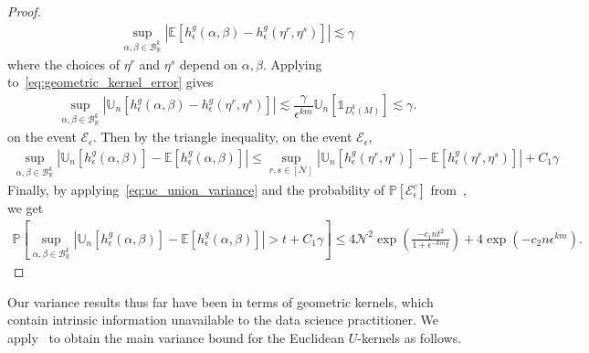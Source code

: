 \documentclass[11pt,reqno]{amsproc}
\numberwithin{equation}{section}
\newcommand{\R}{\mathbb{R}}
\newcommand{\E}{\mathbb{E}}
\newcommand{\U}{\mathbb{U}}
\newcommand{\PP}{\mathbb{P}}
\newcommand{\one}{\mathbb{1}}
\newcommand{\cN}{\mathcal{N}}
\newcommand{\cE}{\mathcal{E}}
\newcommand{\cB}{\mathcal{B}}
\newcommand{\ls}{\lesssim}
\theoremstyle{definition}
\theoremstyle{plain}
\begin{document}
\begin{proof}
        \begin{align}
            \sup_{\alpha, \beta \in \cB_\R^k} \left| \E[h^g_\epsilon(\alpha, \beta)-h^g_\epsilon(\eta^r, \eta^s)] \right| \ls \gamma
        \end{align}
        where the choices of $\eta^r$ and $\eta^s$ depend on $\alpha, \beta$. Applying~ to~\eqref{eq:geometric_kernel_error} gives
        \begin{align}
            \sup_{\alpha, \beta \in \cB_\R^k} \left| \U_n[h^g_\epsilon(\alpha, \beta)-h^g_\epsilon(\eta^r, \eta^s)] \right| \ls \dfrac{\gamma}{\epsilon^{km}} \U_n[\one_{D_\epsilon^k(M)}] \ls \gamma.
        \end{align}
        on the event $\cE_\epsilon$. Then by the triangle inequality, on the event $\cE_\epsilon$,
        \begin{align}
            \sup_{\alpha, \beta \in \cB_\R^k} \left| \U_n[h^g_\epsilon(\alpha, \beta)] - \E[h^g_\epsilon(\alpha, \beta)]\right| \leq  \sup_{r,s \in [\cN] }\left| \U_n[h^g_\epsilon(\eta^r, \eta^s)] - \E[h^g_\epsilon(\eta^r, \eta^s)]\right| + C_1 \gamma
        \end{align}
        Finally, by applying~\eqref{eq:uc_union_variance} and the probability of $\PP[\cE_\epsilon^c]$ from~, we get
        \begin{align}
            \PP \left[ \sup_{\alpha, \beta \in \cB_\R^k} \left| \U_n[h^g_\epsilon(\alpha, \beta)] - \E[h^g_\epsilon(\alpha, \beta)]\right| > t + C_1\gamma  \right] \leq 4\cN^2 \exp\left(\frac{-c_1 n t^2}{1 +  \epsilon^{-km}t}\right) + 4\exp( - c_2n \epsilon^{km}).
        \end{align}
    \end{proof}

    Our variance results thus far have been in terms of geometric kernels, which contain intrinsic information unavailable to the data science practitioner. We apply~ to obtain the main variance bound for the Euclidean $U$-kernels as follows. 
\end{document}
